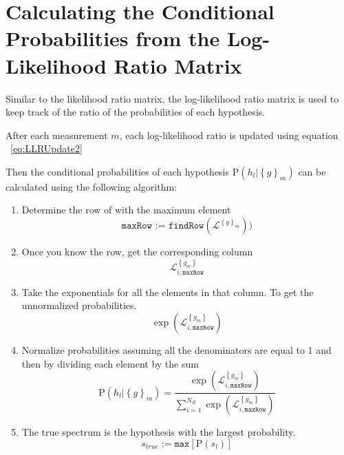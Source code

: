 \section{Calculating the Conditional Probabilities from the Log-Likelihood Ratio Matrix}

Similar to the likelihood ratio matrix, the log-likelihood ratio matrix is used to keep track of the ratio of the probabilities of each hypothesis.

After each measurement $m$, each log-likelihood ratio is updated using equation ~\ref{eq:LLRUpdate2}

Then the conditional probabilities of each hypothesis $\mbox{P}(h_l | \left\{ g \right\}_m)$ can be calculated using the following algorithm:

\begin{enumerate}
    \item Determine the row of with the maximum element
    \begin{equation}
    \texttt{maxRow := } \texttt{findRow}(\pmb{\mathscr{L}}^{\left\{ g \right\}_m}))
    \end{equation}
    \item Once you know the row, get the corresponding column
    \begin{equation}
    \mathscr{L}_{i,\texttt{maxRow}}^{ \left\{ g_{m} \right\} }
    \end{equation}
    \item Take the exponentials for all the elements in that column. To get the unnormalized probabilities.
    \begin{equation}
    \exp ( \mathscr{L}_{i,\texttt{maxRow}}^{ \left\{g_{m} \right\} } )
    \end{equation}
    \item Normalize probabilities assuming all the denominators are equal to 1 and then by dividing each element by the sum
    \begin{equation}
    \mbox{P}(h_l | \left\{ g \right\}_m )
    =
    \frac
    {
        \exp ( \mathscr{L}_{i,\texttt{maxRow}}^{ \left\{g_{m} \right\} } )
    }
    {
        \sum_{i = 1}^{N_R} \exp ( \mathscr{L}_{i,\texttt{maxRow}}^{ \left\{g_{m} \right\} } )
    }
    \end{equation}
    \item The true spectrum is the hypothesis with the largest probability.
    \begin{equation}
        s_{true} := \texttt{max}\left[\mbox{P}(s_{l}) \right]
    \end{equation}
\end{enumerate}

